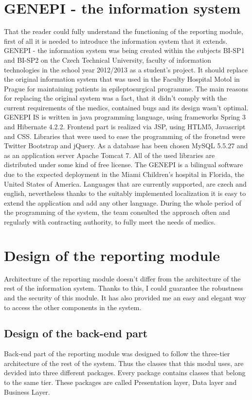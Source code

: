 \documentclass[thesis=B,english]{FITthesis}[2012/10/20]
\begin{document}
\section{GENEPI - the information system}
That the reader could fully understand the functioning of the reporting module, first of all it is needed to introduce the information system that it extends. GENEPI - the information system was being created within the subjects BI-SP1 and BI-SP2 on the Czech Technical University, faculty of information technologies in the school year 2012/2013 as a student's project. It should replace the original information system that was used in the Faculty Hospital Motol in Prague for maintaining patients in epileptosurgical programme. The main reasons for replacing the original system was a fact, that it didn't comply with the current requirements of the medics, contained bugs and its design wasn't optimal. GENEPI IS is written in java programming language, using frameworks Spring 3 and Hibernate 4.2.2. Frontend part is realized via JSP, using HTLM5, Javascript and CSS. Libraries that were used to ease the programming of the fronetnd were Twitter Bootstrap and jQuery. As a database has been chosen MySQL 5.5.27 and as an application server Apache Tomcat 7. All of the used libraries are distributed under some kind of free license. The GENEPI is a bilingual software due to the expected deployment in the Miami Children's hospital in Florida, the United States of America. Languages that are currently supported, are czech and english, nevertheless thanks to the suitably implemented localization it is easy to extend the application and add any other language. During the whole period of the programming of the system, the team consulted the approach often  and regularly with contracting authority, to fully meet the needs of medics.

\section{Design of the reporting module}
Architecture of the reporting module doesn't differ from the architecture of the rest of the information system. Thanks to this, I could guarantee the robustness and the security of this module. It has also provided me an easy and elegant way to access the other components in the system.

\subsection{Design of the back-end part}
Back-end part of the reporting module was designed to follow the three-tier architecture of the rest of the system. Thus the classes that this modul uses, are devided into three different packages. Every package contains classes that belong to the same tier. These packages are called Presentation layer, Data layer and Business Layer.
\end{document}
